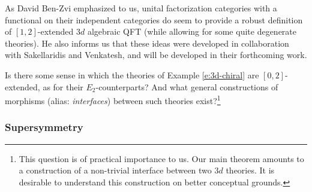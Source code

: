 \begin{rem}
\notready

As David Ben-Zvi emphasized to us, unital factorization categories
with a functional on their independent categories
do seem to provide a robust
definition of $[1,2]$-extended $3d$ algebraic QFT (while allowing for
some quite degenerate theories). He also informs us that
these ideas were developed in collaboration with Sakellaridis and Venkatesh,
and will be developed in their forthcoming work.

\end{rem}

\begin{question}
\notready

Is there some sense in which the theories of Example \ref{e:3d-chiral}
are $[0,2]$-extended, as for their $E_2$-counterparts?
And what general constructions of morphisms
(alias: \emph{interfaces}) between such theories exist?\footnote{This question
is of practical importance to us. Our
main theorem amounts to a construction of a non-trivial interface
between two $3d$ theories. It is desirable to understand this construction on
better conceptual grounds.}

\end{question}

\subsubsection{Supersymmetry}

